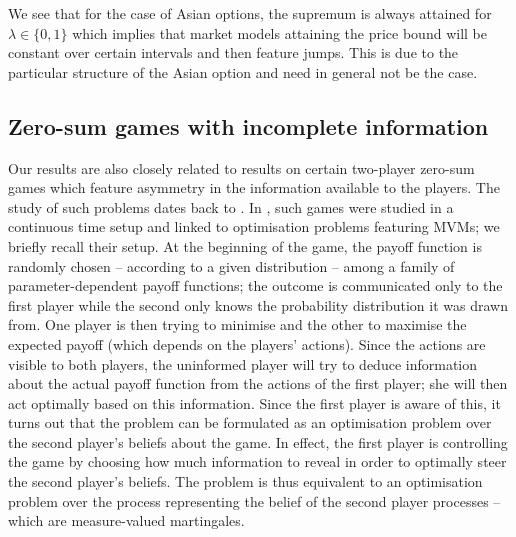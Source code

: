 \documentclass{article}
\theoremstyle{definition}
\numberwithin{equation}{section}
\numberwithin{theorem}{section}
\begin{document}
	
	 
	We see that for the case of Asian options, the supremum is always attained for $\lambda\in\{0,1\}$ which implies that market models attaining the price bound will be constant over certain intervals and then feature jumps. This is due to the particular structure of the Asian option and need in general not be the case. 
	
	
	
	
	
	
	
	
	
	\subsection{Zero-sum games with incomplete information} \label{sec:ZSG}
	Our results are also closely related to results on certain two-player zero-sum games which feature asymmetry in the information available to the players. The study of such problems dates back to \cite{aumann1995}. In \cite{cardaliaguet_rainer2009,cardaliaguet2012}, such games were studied in a continuous time setup and linked to optimisation problems featuring MVMs; we briefly recall their setup. At the beginning of the game, the payoff function is randomly chosen -- according to a given distribution -- among a family of parameter-dependent payoff functions; the outcome is communicated only to the first player while the second only knows the probability distribution it was drawn from. One player is then trying to minimise and the other to maximise the expected payoff (which depends on the players' actions).  Since the actions are visible to both players, the uninformed player will try to deduce information about the actual payoff function from the actions of the first player; she will then act optimally based on this information. Since the first player is aware of this, it turns out that the problem can be formulated as an optimisation problem over the second player's beliefs about the game. In effect, the first player is controlling the game by choosing how much information to reveal in order to optimally steer the second player's beliefs. The problem is thus equivalent to an optimisation problem over the process representing the belief of the second player processes -- which are measure-valued martingales.
	
\end{document}

